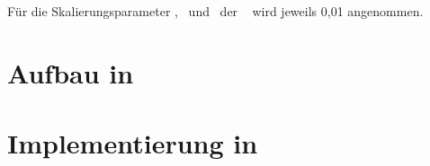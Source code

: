 Für die Skalierungsparameter \xopth, \pheth\ und \phzth\ der \crb\  wird jeweils 0,01 angenommen.


\section{Aufbau in \Simulink}



\section{Implementierung in \Matlab}

%
%
%
%
%
%
